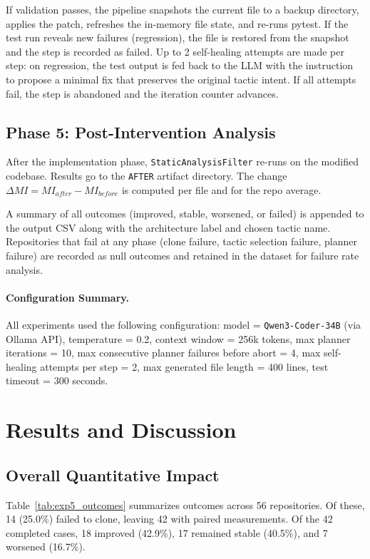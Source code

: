 \documentclass[sigconf,review,anonymous]{acmart}
\begin{document}
If validation passes, the pipeline snapshots the current file to a backup directory, applies the patch, refreshes the in-memory file state, and re-runs pytest. If the test run reveals new failures (regression), the file is restored from the snapshot and the step is recorded as failed. Up to 2 self-healing attempts are made per step: on regression, the test output is fed back to the LLM with the instruction to propose a minimal fix that preserves the original tactic intent. If all attempts fail, the step is abandoned and the iteration counter advances.

\subsection{Phase 5: Post-Intervention Analysis}

After the implementation phase, \texttt{StaticAnalysisFilter} re-runs on the modified codebase. Results go to the \texttt{AFTER} artifact directory. The change $\Delta MI = MI_{after} - MI_{before}$ is computed per file and for the repo average.

A summary of all outcomes (improved, stable, worsened, or failed) is appended to the output CSV along with the architecture label and chosen tactic name. Repositories that fail at any phase (clone failure, tactic selection failure, planner failure) are recorded as null outcomes and retained in the dataset for failure rate analysis.

\paragraph{Configuration Summary.}
All experiments used the following configuration: model = \texttt{Qwen3-Coder-34B} (via Ollama API), temperature = 0.2, context window = 256k tokens, max planner iterations = 10, max consecutive planner failures before abort = 4, max self-healing attempts per step = 2, max generated file length = 400 lines, test timeout = 300 seconds.

\section{Results and Discussion}

\subsection{Overall Quantitative Impact}

Table~\ref{tab:exp5_outcomes} summarizes outcomes across 56 repositories. Of these, 14 (25.0\%) failed to clone, leaving 42 with paired measurements. Of the 42 completed cases, 18 improved (42.9\%), 17 remained stable (40.5\%), and 7 worsened (16.7\%).
\end{document}
